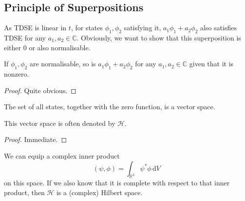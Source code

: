 \subsection{Principle of Superpositions}
As TDSE is linear in $t$, for states $\phi_1,\phi_2$ satisfying it, $a_1\phi_1+a_2\phi_2$ also satisfies TDSE for any $a_1,a_2\in\mathbb C$.
Obviously, we want to show that this superposition is either $0$ or also normalisable.
\begin{proposition}
    If $\phi_1,\phi_2$ are normalisable, so is $a_1\phi_1+a_2\phi_2$ for any $a_1,a_2\in\mathbb C$ given that it is nonzero.
\end{proposition}
\begin{proof}
    Quite obvious.
\end{proof}
\begin{corollary}
    The set of all states, together with the zero function, is a vector space.
\end{corollary}
This vector space is often denoted by $\mathcal H$.
\begin{proof}
    Immediate.
\end{proof}
We can equip a complex inner product
$$(\psi,\phi)=\int_{\mathbb R^3}\psi^*\phi\,\mathrm dV$$
on this space.
If we also know that it is complete with respect to that inner product, then $\mathcal H$ is a (complex) Hilbert space.
